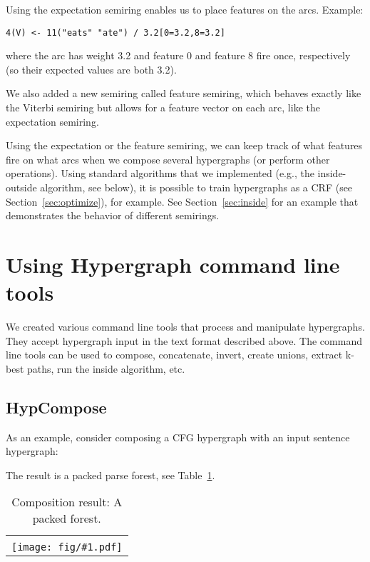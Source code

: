 \documentclass[12pt]{article}
\newcommand{\tabref}[1]{Table~\ref{tab:#1}}
\newcommand{\secref}[1]{Section~\ref{sec:#1}}
\newcommand{\example}[4]{
  \begin{table}[!tbp]
    \centering
    \begin{tabular}{ l }\hline
      
      \vspace{#4}
      \\
      \texttt{[image: fig/\#1.pdf]} \\\hline
    \end{tabular}
    \caption{#2}
    \label{tab:#1}
  \end{table}
}
\begin{document}
Using the expectation semiring enables us to place features on the
arcs. Example:

\begin{verbatim}
4(V) <- 11("eats" "ate") / 3.2[0=3.2,8=3.2]
\end{verbatim}

where the arc has weight 3.2 and feature 0 and feature 8 fire once,
respectively (so their expected values are both 3.2).

We also added a new semiring called feature semiring, which behaves
exactly like the Viterbi semiring but allows for a feature vector on
each arc, like the expectation semiring.

Using the expectation or the feature semiring, we can keep track of
what features fire on what arcs when we compose several hypergraphs
(or perform other operations). Using standard algorithms that we
implemented (e.g., the inside-outside algorithm, see below), it is
possible to train hypergraphs as a CRF (see \secref{optimize}), for
example. See \secref{inside} for an example that demonstrates the
behavior of different semirings.

\section{Using Hypergraph command line tools}

We created various command line tools that process and manipulate
hypergraphs. They accept hypergraph input in the text format described
above. The command line tools can be used to compose, concatenate,
invert, create unions, extract k-best paths, run the inside algorithm,
etc.

\subsection{HypCompose}\label{sec:compose}

As an example, consider composing a CFG hypergraph with an input
sentence hypergraph:


\noindent The result is a packed parse forest, see
\tabref{compose_result}.
\example{compose_result}{Composition result: A packed forest.}{0.8}{0.3cm}
\end{document}
